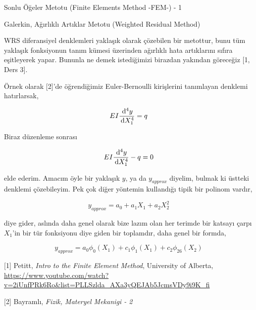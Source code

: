 \documentclass[12pt,fleqn]{article}\usepackage{../../common}
\begin{document}
Sonlu Öğeler Metotu (Finite Elements Method -FEM-) - 1

Galerkin, Ağırlıklı Artıklar Metotu (Weighted Residual Method)

WRS diferansiyel denklemleri yaklaşık olarak çözebilen bir metottur, bunu tüm
yaklaşık fonksiyonun tanım kümesi üzerinden ağırlıklı hata artıklarını sıfıra
eşitleyerek yapar. Bununla ne demek istediğimizi birazdan yakından göreceğiz
[1, Ders 3].

Örnek olarak [2]'de öğrendiğimiz Euler-Bernoulli kirişlerini tanımlayan denklemi
hatırlarsak,

$$
E I \frac{\,\mathrm{d}^4 y}{\,\mathrm{d} X_1^4} = q
$$

Biraz düzenleme sonrası

$$
E I \frac{\,\mathrm{d}^4 y}{\,\mathrm{d} X_1^4} - q = 0
$$

elde ederim. Amacım öyle bir yaklaşık $y$, ya da $y_{approx}$ diyelim, bulmak ki
üstteki denklemi çözebileyim. Pek çok diğer yöntemin kullandığı tipik bir
polinom vardır,

$$
y_{approx} = a_0 + a_1 X_1 + a_2 X_2^2 
$$

diye gider, aslında daha genel olarak bize lazım olan her terimde bir katsayı
çarpı $X_1$'in bir tür fonksiyonu diye giden bir toplamdır, daha genel bir
formda,

$$
y_{approx} = a_0 \phi_0(X_1) + c_1 \phi_1(X_1) + c_2 \phi_26(X_2) 
$$
















[1] Petitt, {\em Intro to the Finite Element Method}, University of Alberta,
    \url{https://www.youtube.com/watch?v=2iUnfPRk6Ro&list=PLLSzlda_AXa3yQEJAb5JcmsVDy9i9K_fi}

[2] Bayramlı, {\em Fizik, Materyel Mekanigi - 2}
    
\end{document}
